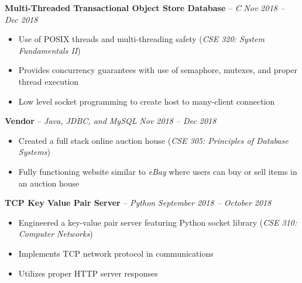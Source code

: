 \documentclass[11pt,letterpaper]{article}
\begin{document}
\spacedhrule{0.2em}{-0.8em} 










\headedsection 
{\textbf{Multi-Threaded Transactional Object Store Database} -- \textit{C}}
{\textit{Nov 2018 -- Dec 2018}} {
	\begin{itemize}[noitemsep,nolistsep]
		\item Use of POSIX threads and multi-threading safety (\textit{CSE 320: System Fundamentals II})
		\item Provides concurrency guarantees with use of semaphore, mutexes, and proper thread execution
		\item Low level socket programming to create host to many-client connection
	\end{itemize}
}
				
										
\headedsection 
{\textbf{Vendor} -- \textit{Java, JDBC, and MySQL}}
{\textit{Nov 2018 -- Dec 2018}} {
	\begin{itemize}[noitemsep,nolistsep]
		\item Created a full stack online auction house (\textit{CSE 305: Principles of Database Systems})
		\item Fully functioning website similar to \textit{eBay} where users can buy or sell items in an auction house
	\end{itemize}
}

										
\headedsection 
{\textbf{TCP Key Value Pair Server} -- \textit{Python}}
{\textit{September 2018 -- October 2018}} {
	\begin{itemize}[noitemsep,nolistsep]
		\item Engineered a key-value pair server featuring Python socket library (\textit{CSE 310: Computer Networks})
		\item Implements TCP network protocol in communications	
		\item Utilizes proper HTTP server responses
	\end{itemize}
}	
\end{document}
